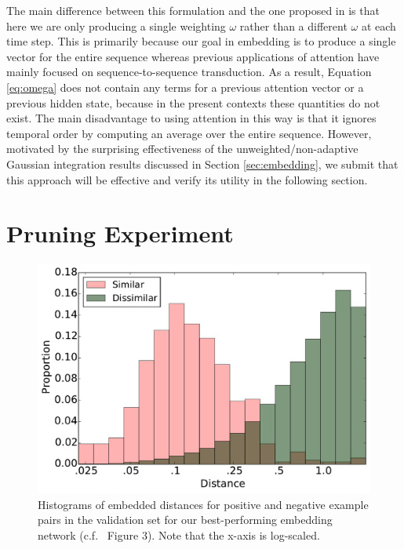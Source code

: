 \documentclass{article}
\begin{document}
The main difference between this formulation and the one proposed in \cite{bahdanau2014neural, cho2015describing} is that here we are only producing a single weighting $\omega$ rather than a different $\omega$ at each time step.
This is primarily because our goal in embedding is to produce a single vector for the entire sequence whereas previous applications of attention have mainly focused on sequence-to-sequence transduction.
As a result, Equation \ref{eq:omega} does not contain any terms for a previous attention vector or a previous hidden state, because in the present contexts these quantities do not exist.
The main disadvantage to using attention in this way is that it ignores temporal order by computing an average over the entire sequence.
However, motivated by the surprising effectiveness of the unweighted/non-adaptive Gaussian integration results discussed in Section \ref{sec:embedding}, we submit that this approach will be effective and verify its utility in the following section.

\section{Pruning Experiment}
\label{sec:experiment}

\begin{figure}[t]
  \centering
  \includegraphics[width=\columnwidth]{distances.pdf}
  \caption{Histograms of embedded distances for positive and negative example pairs in the validation set for our best-performing embedding network (c.f.\ \cite{raffel2015large} Figure 3).  Note that the x-axis is log-scaled.}
  \label{fig:distances}
\end{figure}
\end{document}
